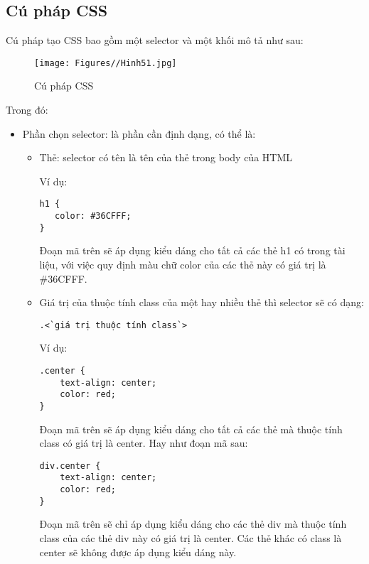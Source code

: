 \subsection {Cú pháp CSS}
Cú pháp tạo CSS bao gồm một {\ttfamily selector} và một khối mô tả như sau:
\begin{figure}[!ht]
\centering
\texttt{[image: Figures//Hinh51.jpg]}
\caption{ Cú pháp CSS }\label{hinh51} 
\end{figure}
Trong đó:
\begin{itemize}

\item	Phần chọn {\ttfamily selector}: là phần cần định dạng, có thể là:


\begin{itemize} 
\item	Thẻ: {\ttfamily selector} có tên là tên của thẻ trong {\ttfamily body} của HTML

Ví dụ:
\lstset{language=XML}
\begin{lstlisting}[escapechar=`]
h1 {
   color: #36CFFF; 
}
\end{lstlisting}

Đoạn mã trên sẽ áp dụng kiểu dáng cho tất cả các thẻ {\ttfamily h1} có trong tài liệu, với việc quy định màu chữ {\ttfamily color} của các thẻ này có giá trị là {\ttfamily \#36CFFF}.

\item	Giá trị của thuộc tính {\ttfamily class} của một hay nhiều thẻ thì {\ttfamily selector} sẽ có dạng:
\lstset{language=XML}
\begin{lstlisting}[escapechar=`]
	.<`giá trị thuộc tính class`>
\end{lstlisting}

Ví dụ:
\lstset{language=XML}
\begin{lstlisting}[escapechar=`]
.center {
    text-align: center;
    color: red;
}
\end{lstlisting}

Đoạn mã trên sẽ áp dụng kiểu dáng cho tất cả các thẻ mà thuộc tính {\ttfamily class} có giá trị là {\ttfamily center}. Hay như đoạn mã sau:
\lstset{language=XML}
\begin{lstlisting}[escapechar=`]
div.center {
    text-align: center;
    color: red;
}
\end{lstlisting}

Đoạn mã trên sẽ chỉ áp dụng kiểu dáng cho các thẻ {\ttfamily div} mà thuộc tính {\ttfamily class} của các thẻ {\ttfamily div} này có giá trị là {\ttfamily center}. Các thẻ khác có {\ttfamily class} là {\ttfamily center} sẽ không được áp dụng kiểu dáng này.


\end{itemize}
\end{itemize}
